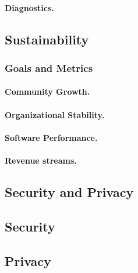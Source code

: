 \documentclass[11pt]{article}
\begin{document}
\paragraph{Diagnostics.}

\subsection{Sustainability}
\subsubsection{Goals and Metrics}
\paragraph{Community Growth.}
\paragraph{Organizational Stability.}
\paragraph{Software Performance.}
\paragraph{Revenue streams.}

\subsection{Security and Privacy}
\subsection{Security}
\subsection{Privacy}

\newpage
\printbibliography
\end{document}
